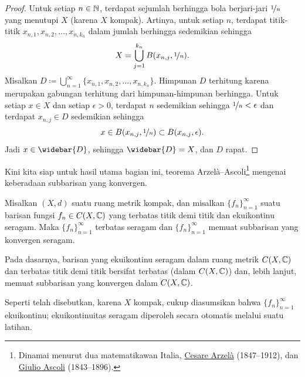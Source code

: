\begin{proof}
Untuk setiap $n \in {\mathbb{N}}$, terdapat sejumlah berhingga
bola berjari-jari $\nicefrac{1}{n}$ yang menutupi $X$ (karena $X$ kompak). Artinya,
untuk setiap $n$, terdapat
titik-titik $x_{n,1},x_{n,2},\ldots,x_{n,k_n}$ dalam jumlah berhingga sedemikian sehingga
\begin{equation*}
X= \bigcup_{j=1}^{k_n} B(x_{n,j},\nicefrac{1}{n}) .
\end{equation*}
Misalkan $D \coloneqq \bigcup_{n=1}^\infty \{ x_{n,1},x_{n,2},\ldots,x_{n,k_n} \}$.
Himpunan $D$ terhitung karena merupakan gabungan terhitung dari himpunan-himpunan berhingga.
Untuk setiap $x \in X$
dan setiap $\epsilon > 0$, terdapat $n$ sedemikian sehingga
$\nicefrac{1}{n} < \epsilon$ dan terdapat $x_{n,j} \in D$ sedemikian sehingga
\begin{equation*}
x \in B(x_{n,j},\nicefrac{1}{n}) \subset B(x_{n,j},\epsilon) .
\end{equation*}
Jadi $x \in \widebar{D}$, sehingga $\widebar{D} = X$, dan $D$ rapat.
\end{proof}

Kini kita siap untuk hasil utama bagian ini,
teorema Arzel\`a--Ascoli\footnote{%
Dinamai menurut dua matematikawan Italia,
\href{https://en.wikipedia.org/wiki/Cesare_Arzel\%C3\%A0}{Cesare Arzel\`a}
(1847--1912), dan
\href{https://en.wikipedia.org/wiki/Giulio_Ascoli}{Giulio Ascoli}
(1843--1896).} mengenai keberadaan subbarisan yang konvergen.

\begin{thm}
\label{thm:arzelaascoli}
Misalkan $(X,d)$ suatu ruang metrik kompak, dan misalkan $\{ f_n \}_{n=1}^\infty$
suatu barisan fungsi $f_n \in C(X,{\mathbb{C}})$ yang terbatas titik demi titik
dan ekuikontinu seragam.  Maka
$\{f_n\}_{n=1}^\infty$ terbatas seragam dan $\{ f_n \}_{n=1}^\infty$ memuat subbarisan yang
konvergen seragam.
\end{thm}

Pada dasarnya, barisan yang ekuikontinu seragam dalam ruang metrik
$C(X,{\mathbb{C}})$ dan terbatas titik demi titik
bersifat terbatas (dalam $C(X,{\mathbb{C}})$) dan, lebih lanjut, memuat subbarisan yang
konvergen dalam $C(X,{\mathbb{C}})$.

Seperti telah disebutkan, karena $X$ kompak, cukup
diasumsikan bahwa $\{ f_n \}_{n=1}^\infty$ ekuikontinu;
ekuikontinuitas seragam diperoleh secara otomatis melalui suatu latihan.

